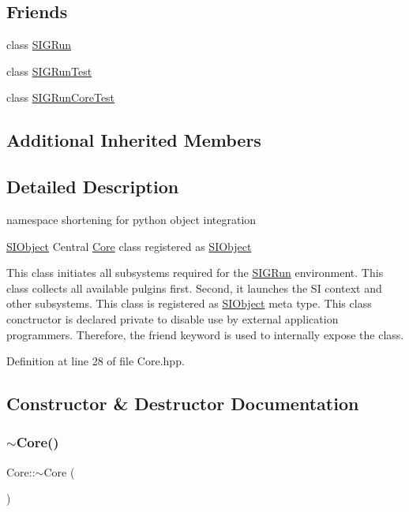 \subsection*{Friends}
\begin{DoxyCompactItemize}
\item 
class \mbox{\hyperlink{class_core_a5f9132838c20db918d2592c4c0f0dcbb}{S\+I\+G\+Run}}
\item 
class \mbox{\hyperlink{class_core_a703c4760c08c6e9065d8bd71b05c3d63}{S\+I\+G\+Run\+Test}}
\item 
class \mbox{\hyperlink{class_core_a0428dbcb31e2aacead72907324826035}{S\+I\+G\+Run\+Core\+Test}}
\end{DoxyCompactItemize}
\subsection*{Additional Inherited Members}


\subsection{Detailed Description}
namespace shortening for python object integration 

\mbox{\hyperlink{class_s_i_object}{S\+I\+Object}} Central \mbox{\hyperlink{class_core}{Core}} class registered as \mbox{\hyperlink{class_s_i_object}{S\+I\+Object}}

This class initiates all subsystems required for the \mbox{\hyperlink{class_s_i_g_run}{S\+I\+G\+Run}} environment. This class collects all available pulgins first. Second, it launches the SI context and other subsystems. This class is registered as \mbox{\hyperlink{class_s_i_object}{S\+I\+Object}} meta type. This class conctructor is declared private to disable use by external application programmers. Therefore, the friend keyword is used to internally expose the class. 

Definition at line 28 of file Core.\+hpp.



\subsection{Constructor \& Destructor Documentation}
\mbox{\label{class_core_a776f8c46504b14183883c6273f93eaed}} 
\subsubsection{\texorpdfstring{$\sim$Core()}{~Core()}}
{\footnotesize\ttfamily Core\+::$\sim$\+Core (\begin{DoxyParamCaption}{ }\end{DoxyParamCaption})}



